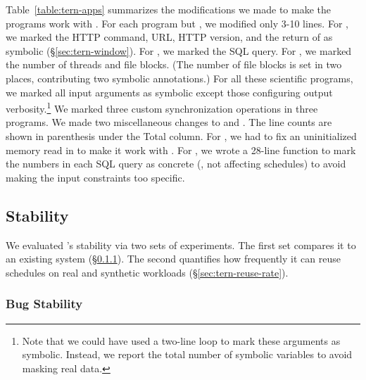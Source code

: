 Table~\ref{table:tern-apps} summarizes the modifications we made to make the
programs work with \tern.  For each program but \mysql, we modified only 3-10
lines.  For \apache, we marked the HTTP command, URL, HTTP version, and the
return of  as symbolic (\S\ref{sec:tern-window}).  For \mysql,
we marked the SQL query.  For \pbzip, we marked the number of threads and
file blocks.  (The number of file blocks is set in two places,
contributing two symbolic annotations.)  For all these scientific programs, we
marked all input arguments as symbolic except those configuring output
verbosity.\footnote{Note that we could have used a two-line loop to mark
  these arguments as symbolic.  Instead, we report the total number of
  symbolic variables to avoid masking real data.}  We marked three custom
synchronization operations in three \splash programs.  We made two
miscellaneous changes to \apache and \mysql.  The line counts are shown in
parenthesis under the Total column.  For \apache, we had to fix an
uninitialized memory read in  to make it work with
\klee.  For \mysql, we wrote a 28-line function to mark the numbers in each
SQL query as concrete (\ie, not affecting schedules) to avoid making the
input constraints too specific.

\subsection{Stability} \label{sec:tern-stability}

We evaluated \tern's stability via two sets of experiments.  The first set
compares it to an existing \dmt system (\S\ref{sec:tern-bug-stable}). The
second quantifies how frequently it can reuse schedules on real and
synthetic workloads (\S\ref{sec:tern-reuse-rate}).

\subsubsection{Bug Stability} \label{sec:tern-bug-stable}


